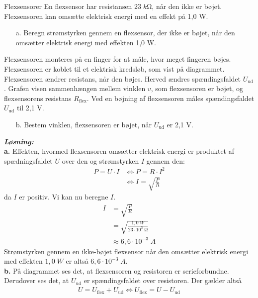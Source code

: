 \documentclass{report}
\newcommand{\sol}{\setlength{\parindent}{0cm}\textbf{\textit{Løsning:}}\setlength{\parindent}{1cm}}
\begin{document}
\begin{question}{Flexsensorer}{}
En flexsensor har resistansen $23 \;\unit{k \ohm} $, når den ikke er bøjet.
Flexsensoren kan omsætte elektrisk energi med en effekt på 1,0 W.
\begin{itemize}
  \item[a.] Beregn strømstyrken gennem en flexsensor, der ikke er bøjet, når den omsætter elektrisk energi med effekten 1,0 W.
\end{itemize}
Flexsensoren monteres på en finger for at måle, hvor meget fingeren bøjes. 
Flexsensoren er koblet til et elektrisk kredsløb, som vist på diagrammet.
Flexsensoren ændrer resistans, når den bøjes. Herved ændres spændingsfaldet $U_\mathrm{ud}$.
Grafen visen sammenhængen mellem vinklen $v$, som flexsensoren er bøjet, og flexsensorens resistans $R_\mathrm{flex}.$
Ved en bøjning af flexsensoren måles spændingsfaldet $U_\mathrm{ud}$ til 2,1 V.
\begin{itemize}
  \item[b.] Bestem vinklen, flexsensoren er bøjet, når $U_\mathrm{ud}$ er 2,1 V.
\end{itemize}
\end{question}
\sol \\
\textbf{a.}
Effekten, hvormed flexsensoren omsætter elektrisk energi er produktet af spædningsfaldet $U$ over den og strømstyrken $I$ gennem den:
\begin{equation*}
\begin{split}
  P=U \cdot I &\iff P=R \cdot I^2\\
  &\iff I=\sqrt{\frac{P}{R}}
\end{split}
\end{equation*}
da $I$ er positiv. 
Vi kan nu beregne $I$.
\begin{equation*}
\begin{split}
  I&=\sqrt{\frac{P}{R}} \\
  &=\sqrt{\frac{1,0 \;\unit{W} }{23 \cdot 10^3\;\unit{\ohm} }} \\
  &\approx 6,6 \cdot 10 ^{-3} \;\unit{A} 
\end{split}
\end{equation*}
Strømstyrken gennem en ikke-bøjet flexsensor når den omsætter elektrisk energi med effekten $1,0 \;\unit{W} $ er altså $6,6 \cdot 10 ^{-3} \;\unit{A} $. \\[1ex]
\textbf{b.}
På diagrammet ses det, at flexsensoren og resistoren er serieforbundne.
Derudover ses det, at $U_{\text{ud} }$ er spændingsfaldet over resistoren. 
Der gælder altså 
\begin{equation*}
\begin{split}
  U=U _{\text{flex} }+ U _{\text{ud} } \iff U _{\text{flex} }=U-U _{\text{ud} }
\end{split}
\end{equation*}
\end{document}
